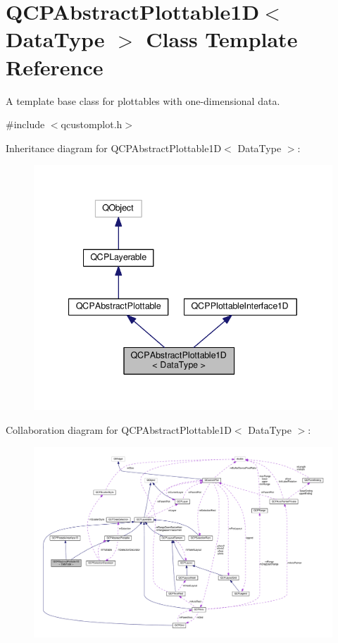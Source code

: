 \hypertarget{classQCPAbstractPlottable1D}{}\section{Q\+C\+P\+Abstract\+Plottable1D$<$ Data\+Type $>$ Class Template Reference}
\label{classQCPAbstractPlottable1D}


A template base class for plottables with one-\/dimensional data.  




{\ttfamily \#include $<$qcustomplot.\+h$>$}



Inheritance diagram for Q\+C\+P\+Abstract\+Plottable1D$<$ Data\+Type $>$\+:
\nopagebreak
\begin{figure}[H]
\begin{center}
\leavevmode
\includegraphics[width=340pt]{classQCPAbstractPlottable1D__inherit__graph}
\end{center}
\end{figure}


Collaboration diagram for Q\+C\+P\+Abstract\+Plottable1D$<$ Data\+Type $>$\+:
\nopagebreak
\begin{figure}[H]
\begin{center}
\leavevmode
\includegraphics[width=350pt]{classQCPAbstractPlottable1D__coll__graph}
\end{center}
\end{figure}
